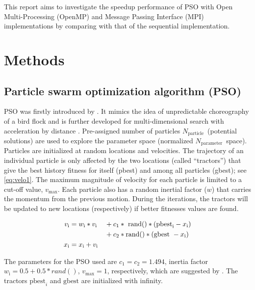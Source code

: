\documentclass[conference, 10pt]{IEEEtran}
\newcommand{\N}[1]{\ensuremath{N_\text{#1}}}
\newcommand{\Nparam}{\N{parameter}}
\newcommand{\Np}{\N{particle}}
\begin{document}
This report aims to investigate the speedup performance of PSO with Open Multi-Processing (OpenMP) and Message Passing Interface (MPI) implementations by comparing with that of the sequential implementation.  


\section{Methods}
\subsection{Particle swarm optimization algorithm (PSO)}
PSO was firstly introduced by \cite{Eberhart+Kennedy}.
It mimics the idea of unpredictable choreography of a bird flock and is further developed for multi-dimensional search with acceleration by distance \cite{Eberhart+Shi2001}.
Pre-assigned number of  particles \Np\ (potential solutions) are used to explore the parameter space (normalized \Nparam\ space).
Particles are initialized at random locations and velocities.
The trajectory of an individual particle is only affected by the two locations (called ``tractors'') that give the best history fitness for itself (pbest) and among all particles (gbest); see \cref{eq:velo1}.
The maximum magnitude of velocity for each particle is limited to a cut-off value, $v_\text{max}$. 
Each particle also has a random inertial factor ($w$) that carries the momentum from the previous motion.
During the iterations, the tractors will be updated to new locations (respectively) if better fitnesses values are found. 


\begin{align}
v_\text{i} &= w_\text{i} \ast v_\text{i} &&+ c_1 \ast\text{ rand()} \ast (\text{pbest}_\text{i} - x_\text{i}) \notag\\
		 &						     &&+ c_2 \ast \text{rand()} \ast (\text{gbest}\ - x_\text{i}) 
\label{eq:velo1}\\ 
x_\text{i} &= x_\text{i} + v_\text{i}	
\label{eq:velo2}						   
\end{align}


The parameters for the PSO used are $c_1=c_2=1.494$, inertia factor $w_\text{i}=0.5+0.5\ast rand()$, $v_\text{max}=1$, respectively, which are suggested by \cite{Eberhart+Shi2001}.
The tractors $\text{pbest}_{i}$ and $\text{gbest}$ are initialized with infinity.
\end{document}
